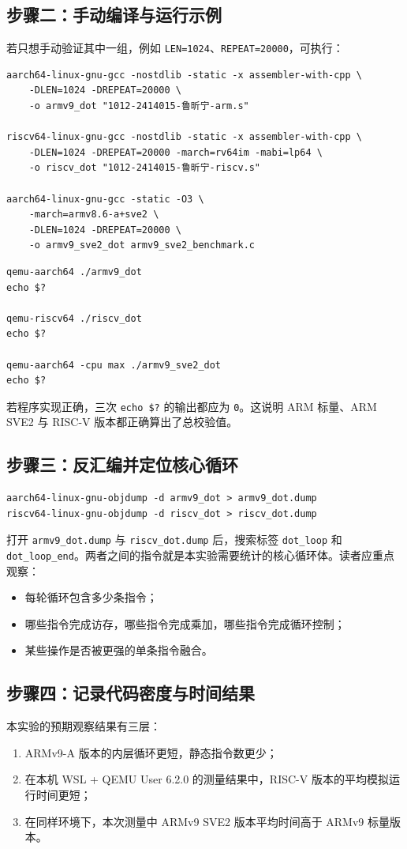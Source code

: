 \documentclass{article}
\begin{document}
\subsection{步骤二：手动编译与运行示例}
若只想手动验证其中一组，例如 \texttt{LEN=1024}、\texttt{REPEAT=20000}，可执行：
\begin{Verbatim}[frame=single]
aarch64-linux-gnu-gcc -nostdlib -static -x assembler-with-cpp \
    -DLEN=1024 -DREPEAT=20000 \
    -o armv9_dot "1012-2414015-鲁昕宁-arm.s"

riscv64-linux-gnu-gcc -nostdlib -static -x assembler-with-cpp \
    -DLEN=1024 -DREPEAT=20000 -march=rv64im -mabi=lp64 \
    -o riscv_dot "1012-2414015-鲁昕宁-riscv.s"

aarch64-linux-gnu-gcc -static -O3 \
    -march=armv8.6-a+sve2 \
    -DLEN=1024 -DREPEAT=20000 \
    -o armv9_sve2_dot armv9_sve2_benchmark.c
\end{Verbatim}

\begin{Verbatim}[frame=single]
qemu-aarch64 ./armv9_dot
echo $?

qemu-riscv64 ./riscv_dot
echo $?

qemu-aarch64 -cpu max ./armv9_sve2_dot
echo $?
\end{Verbatim}

若程序实现正确，三次 \texttt{echo \$?} 的输出都应为 \texttt{0}。这说明 ARM 标量、ARM SVE2 与 RISC-V 版本都正确算出了总校验值。

\subsection{步骤三：反汇编并定位核心循环}
\begin{Verbatim}[frame=single]
aarch64-linux-gnu-objdump -d armv9_dot > armv9_dot.dump
riscv64-linux-gnu-objdump -d riscv_dot > riscv_dot.dump
\end{Verbatim}

打开 \texttt{armv9\_dot.dump} 与 \texttt{riscv\_dot.dump} 后，搜索标签 \texttt{dot\_loop} 和 \texttt{dot\_loop\_end}。两者之间的指令就是本实验需要统计的核心循环体。读者应重点观察：
\begin{itemize}
    \item 每轮循环包含多少条指令；
    \item 哪些指令完成访存，哪些指令完成乘加，哪些指令完成循环控制；
    \item 某些操作是否被更强的单条指令融合。
\end{itemize}

\subsection{步骤四：记录代码密度与时间结果}
本实验的预期观察结果有三层：
\begin{enumerate}
    \item ARMv9-A 版本的内层循环更短，静态指令数更少；
    \item 在本机 WSL + QEMU User 6.2.0 的测量结果中，RISC-V 版本的平均模拟运行时间更短；
    \item 在同样环境下，本次测量中 ARMv9 SVE2 版本平均时间高于 ARMv9 标量版本。
\end{enumerate}
\end{document}
